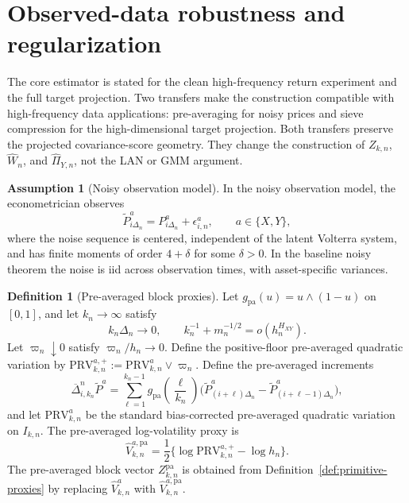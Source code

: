 \documentclass[11pt,a4paper]{amsart}
\theoremstyle{plain}
\theoremstyle{definition}
\newtheorem{definition}[theorem]{Definition}
\newtheorem{assumption}[theorem]{Assumption}
\theoremstyle{remark}
\begin{document}
\section{Observed-data robustness and regularization}\label{sec:robust-extensions}

The core estimator is stated for the clean high-frequency return experiment and the full target
projection.  Two transfers make the construction compatible with high-frequency data applications:
pre-averaging for noisy prices and sieve compression for the high-dimensional target projection.
Both transfers preserve the projected covariance-score geometry.  They change the construction of
\(Z_{k,n}\), \(\widehat W_n\), and \(\widehat\Pi_{Y,n}\), not the LAN or GMM argument.

\begin{assumption}[Noisy observation model]\label{ass:noisy-observation}
In the noisy observation model, the econometrician observes
\[
        \widetilde P_{i\Delta_n}^{a}
        =
        P_{i\Delta_n}^{a}
        +
        \epsilon_{i,n}^{a},
        \qquad
        a\in\{X,Y\},
\]
where the noise sequence is centered, independent of the latent Volterra system, and has finite
moments of order \(4+\delta\) for some \(\delta>0\).  In the baseline noisy theorem the noise is iid
across observation times, with asset-specific variances.
\end{assumption}

\begin{definition}[Pre-averaged block proxies]\label{def:preavg-proxies}
Let \(g_{\mathrm{pa}}(u)=u\wedge(1-u)\) on \([0,1]\), and let \(k_n\to\infty\) satisfy
\[
        k_n\Delta_n\to0,
        \qquad
        k_n^{-1}+m_n^{-1/2}=o(h_n^{H_{XY}}).
\]
Let \(\varpi_n\downarrow0\) satisfy \(\varpi_n/h_n\to0\).  Define the positive-floor
pre-averaged quadratic variation by \(\mathrm{PRV}_{k,n}^{a,+}:=\mathrm{PRV}_{k,n}^{a}\vee\varpi_n\).
Define the pre-averaged increments
\[
        \overline\Delta_{i,k_n}^n\widetilde P^a
        =
        \sum_{\ell=1}^{k_n-1}
        g_{\mathrm{pa}}\!\left(\frac{\ell}{k_n}\right)
        \bigl(
        \widetilde P_{(i+\ell)\Delta_n}^{a}
        -
        \widetilde P_{(i+\ell-1)\Delta_n}^{a}
        \bigr),
\]
and let \(\mathrm{PRV}_{k,n}^{a}\) be the standard bias-corrected pre-averaged quadratic variation
on \(I_{k,n}\).  The pre-averaged log-volatility proxy is
\[
        \widehat V_{k,n}^{a,\mathrm{pa}}
        =
        \frac12\{\log\mathrm{PRV}_{k,n}^{a,+}-\log h_n\}.
\]
The pre-averaged block vector \(Z_{k,n}^{\mathrm{pa}}\) is obtained from
Definition~\ref{def:primitive-proxies} by replacing \(\widehat V_{k,n}^{a}\) with
\(\widehat V_{k,n}^{a,\mathrm{pa}}\).
\end{definition}
\end{document}
